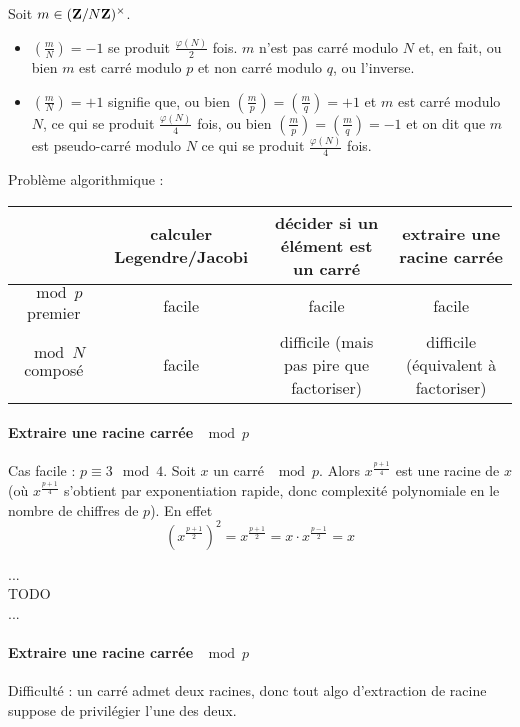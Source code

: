 Soit $m \in (\mathbf{Z} / N\mathbf{Z})^\times$.
\begin{itemize}
	\item[\textbullet] $\left( \frac{m}{N} \right) = -1$ se produit $\frac{\varphi(N)}{2}$ fois.
	$m$ n'est pas carré modulo $N$ et, en fait, ou bien $m$ est carré modulo $p$ et non carré modulo $q$, ou l'inverse.
	\item[\textbullet] $\left( \frac{m}{N} \right) = +1$ signifie que, ou bien $\left( \frac{m}{p} \right) = \left( \frac{m}{q} \right) = +1$ et $m$ est carré modulo $N$, ce qui se produit $\frac{\varphi(N)}{4}$ fois, ou bien $\left( \frac{m}{p} \right) = \left( \frac{m}{q} \right) = -1$ et on dit que $m$ est pseudo-carré modulo $N$ ce qui se produit $\frac{\varphi(N)}{4}$ fois.\\
\end{itemize}

Problème algorithmique :\\
\begin{tabular}{c|c|c|c}
	& calculer Legendre/Jacobi & décider si un élément est un carré & extraire une racine carrée \\
	\hline
	$\mod p$ premier & facile & facile & facile \\
	$\mod N$ composé & facile & difficile (mais pas pire que factoriser) & difficile (équivalent à factoriser)\\
\end{tabular}

\paragraph{Extraire une racine carrée $\mod p$}
Cas facile : $p \equiv 3 \mod 4$.
Soit $x$ un carré $\mod p$.
Alors $x^{\frac{p + 1}{4}}$ est une racine de $x$ (où $x^{\frac{p + 1}{4}}$ s'obtient par exponentiation rapide, donc complexité polynomiale en le nombre de chiffres de $p$).
En effet
$$\left( x^{\frac{p + 1}{2}} \right)^2 = x^{\frac{p + 1}{2}} = x \cdot x^{\frac{p-1}{2}} = x$$

...\\
TODO\\
...\\


\paragraph{Extraire une racine carrée $\mod p$}

Difficulté : un carré admet deux racines, donc tout algo d'extraction de racine suppose de privilégier l'une des deux.

